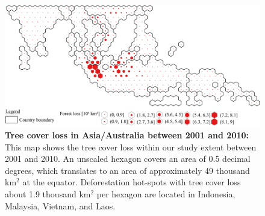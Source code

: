 			\begin{figure}[ht]
				\centering
				\includegraphics[scale=1.]{img/asia_loss_frameless}
				\caption[Tree cover loss in Asia/Australia between 2001 and 2010]{\textbf{Tree cover loss in Asia/Australia between 2001 and 2010:} This map shows the tree cover loss within our study extent between 2001 and 2010. An unscaled hexagon covers an area of 0.5 decimal degrees, which translates to an area of approximately 49 thousand km$^2$ at the equator. Deforestation hot-spots with tree cover loss about 1.9 thousand km$^2$ per hexagon are located in Indonesia, Malaysia, Vietnam, and Laos.}
				\label{fig:asia_loss}
			\end{figure}

